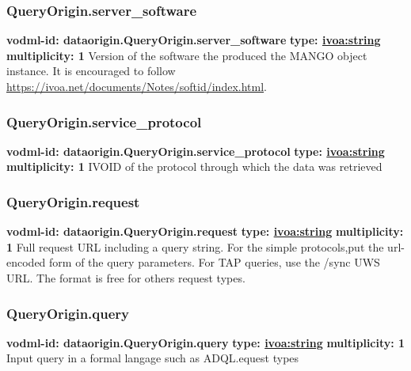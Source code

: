     \subsubsection{QueryOrigin.server\_software}
      \textbf{vodml-id: dataorigin.QueryOrigin.server\_software} \newline
      \textbf{type: \hyperref[sect:ivoa]{ivoa:string}} \newline
      \textbf{multiplicity: 1} \newline 
      Version of the software the produced the MANGO object instance. It is encouraged to follow \url{https://ivoa.net/documents/Notes/softid/index.html}.

    \subsubsection{QueryOrigin.service\_protocol}
      \textbf{vodml-id: dataorigin.QueryOrigin.service\_protocol} \newline
      \textbf{type: \hyperref[sect:ivoa]{ivoa:string}} \newline
      \textbf{multiplicity: 1} \newline 
      IVOID of the protocol through which the data was retrieved

    \subsubsection{QueryOrigin.request}
      \textbf{vodml-id: dataorigin.QueryOrigin.request} \newline
      \textbf{type: \hyperref[sect:ivoa]{ivoa:string}} \newline
      \textbf{multiplicity: 1} \newline 
      Full request URL including a query string. For the simple protocols,put the url-encoded form of the query parameters. For TAP queries, use the /sync UWS URL. The format is free for others request types.

    \subsubsection{QueryOrigin.query}
      \textbf{vodml-id: dataorigin.QueryOrigin.query} \newline
      \textbf{type: \hyperref[sect:ivoa]{ivoa:string}} \newline
      \textbf{multiplicity: 1} \newline 
      Input query in a formal langage such as ADQL.equest types

